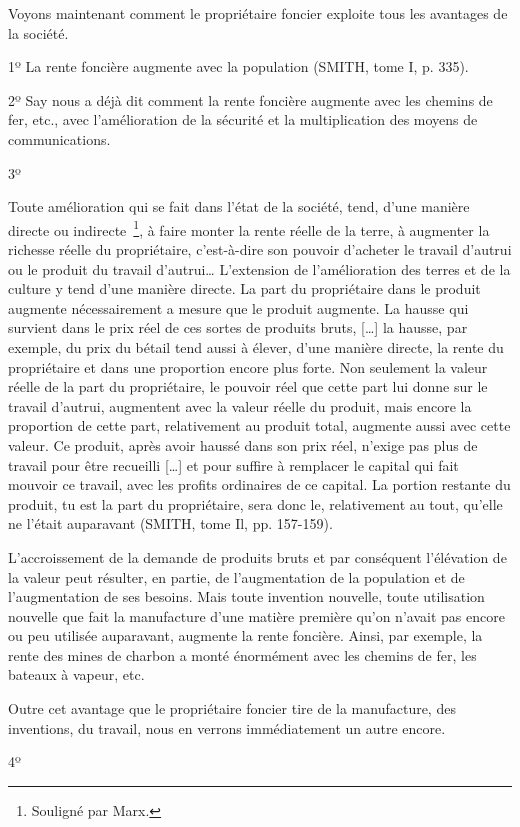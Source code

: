 \documentclass[french,twoside]{book} %
\newenvironment{quoteblock}%
  {\begin{quoting}}
  {\end{quoting}}
\newenvironment{quotebar}{%
    \def\FrameCommand{{\color{rubric!10!}\vrule width 0.5em} \hspace{0.9em}}%
    \def\OuterFrameSep{\itemsep} %
    \MakeFramed {\advance\hsize-\width \FrameRestore}
  }%
  {%
    \endMakeFramed
  }
\renewenvironment{quoteblock}%
  {%
    \savenotes
    \setstretch{0.9}
    \normalfont
    \begin{quotebar}
  }
  {%
    \end{quotebar}
    \spewnotes
  }
\begin{document}
\noindent [VIII] Voyons maintenant comment le propriétaire foncier exploite tous les avantages de la société.\par
1º La rente foncière augmente avec la population (SMITH, tome I, p. 335).\par
2º Say nous a déjà dit comment la rente foncière augmente avec les chemins de fer, etc., avec l’amélioration de la sécurité et la multiplication des moyens de communications.\par
3º\par

\begin{quoteblock}
 \noindent Toute amélioration qui se fait dans l’état de la société, tend, d’une manière directe ou indirecte \footnote{Souligné par Marx.}, à faire monter la rente réelle de la terre, à augmenter la richesse réelle du propriétaire, c’est-à-dire son pouvoir d’acheter le travail d’autrui ou le produit du travail d’autrui… L’extension de l’amélioration des terres et de la culture y tend d’une manière directe. La part du propriétaire dans le produit augmente nécessairement a mesure que le produit augmente. La hausse qui survient dans le prix réel de ces sortes de produits bruts, […] la hausse, par exemple, du prix du bétail tend aussi à élever, d’une manière directe, la rente du propriétaire et dans une proportion encore plus forte. Non seulement la valeur réelle de la part du propriétaire, le pouvoir réel que cette part lui donne sur le travail d’autrui, augmentent avec la valeur réelle du produit, mais encore la proportion de cette part, relativement au produit total, augmente aussi avec cette valeur. Ce produit, après avoir haussé dans son prix réel, n’exige pas plus de travail pour être recueilli […] et pour suffire à remplacer le capital qui fait mouvoir ce travail, avec les profits ordinaires de ce capital. La portion restante du produit, tu est la part du propriétaire, sera donc le, relativement au tout, qu’elle ne l’était auparavant (SMITH, tome Il, pp. 157-159).
 \end{quoteblock}

\noindent [IX] L’accroissement de la demande de produits bruts et par conséquent l’élévation de la valeur peut résulter, en partie, de l’augmentation de la population et de l’augmentation de ses besoins. Mais toute invention nouvelle, toute utilisation nouvelle que fait la manufacture d’une matière première qu’on n’avait pas encore ou peu utilisée auparavant, augmente la rente foncière. Ainsi, par exemple, la rente des mines de charbon a monté énormément avec les chemins de fer, les bateaux à vapeur, etc.\par
Outre cet avantage que le propriétaire foncier tire de la manufacture, des inventions, du travail, nous en verrons immédiatement un autre encore.\par
4º\par
\end{document}
